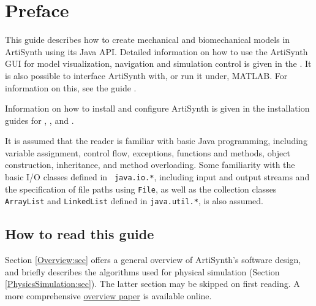 
\def\maindoc{}%
\def\doctitle{ArtiSynth Modeling Guide}




\chapter*{Preface}

This guide describes how to create mechanical and biomechanical models
in ArtiSynth using its Java API.  Detailed information on how to use
the ArtiSynth GUI for model visualization, navigation and simulation
control is given in the
.
It is also possible to interface ArtiSynth with, or run it under,
MATLAB. For information on this, see the guide
.

Information on how to install and configure ArtiSynth is given in the
installation guides for
, 
,
and 
.

It is assumed that the reader is familiar with basic Java programming,
including variable assignment, control flow, exceptions, functions and
methods, object construction, inheritance, and method overloading.
Some familiarity with the basic I/O classes defined in {\tt
java.io.*}, including input and output streams and the specification
of file paths using {\tt File}, as well as the collection classes
{\tt ArrayList} and {\tt LinkedList} defined in {\tt java.util.*}, is
also assumed.

\section*{How to read this guide}

Section \ref{Overview:sec} offers a general overview of ArtiSynth's
software design, and briefly describes the algorithms used for
physical simulation (Section \ref{PhysicsSimulation:sec}). The latter
section may be skipped on first reading. A more comprehensive
\href{http://www.artisynth.org/doc/artisynth.pdf}{overview paper} is
available online.

